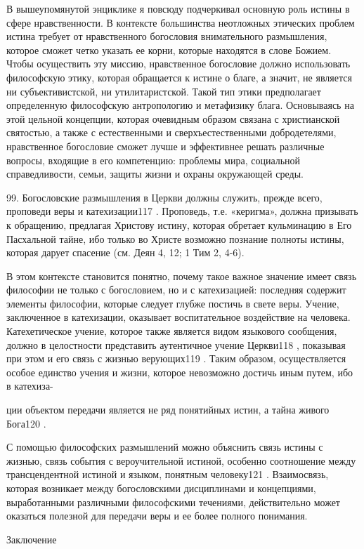 \documentclass[a5paper,10pt]{article}
\begin{document}
В вышеупомянутой энциклике я повсюду подчеркивал основную роль истины в сфере
нравственности. В контексте большинства неотложных этических проблем истина
требует от нравственного богословия внимательного размышления, которое сможет
четко указать ее корни, которые находятся в слове Божием. Чтобы осуществить эту
миссию, нравственное богословие должно использовать философскую этику, которая
обращается к истине о благе, а значит, не является ни субъективистской, ни
утилитаристской. Такой тип этики предполагает определенную философскую
антропологию и метафизику блага. Основываясь на этой цельной концепции, которая
очевидным образом связана с христианской святостью, а также с естественными и
сверхъестественными добродетелями, нравственное богословие сможет лучше и
эффективнее решать различные вопросы, входящие в его компетенцию: проблемы
мира, социальной справедливости, семьи, защиты жизни и охраны окружающей среды.

99. Богословские размышления в Церкви должны служить, прежде всего, проповеди
веры и катехизации117 . Проповедь, т.е. «керигма», должна призывать к
обращению, предлагая Христову истину, которая обретает кульминацию в Его
Пасхальной тайне, ибо только во Христе возможно познание полноты истины,
которая дарует спасение (см. Деян 4, 12; 1 Тим 2, 4-6).

В этом контексте становится понятно, почему такое важное значение имеет связь
философии не только с богословием, но и с катехизацией: последняя содержит
элементы философии, которые следует глубже постичь в свете веры. Учение,
заключенное в катехизации, оказывает воспитательное воздействие на человека.
Катехетическое учение, которое также является видом языкового сообщения, должно
в целостности представить аутентичное учение Церкви118 , показывая при этом и
его связь с жизнью верующих119 . Таким образом, осуществляется особое единство
учения и жизни, которое невозможно достичь иным путем, ибо в катехиза-

ции объектом передачи является не ряд понятийных истин, а тайна живого Бога120
.

С помощью философских размышлений можно объяснить связь истины с жизнью, связь
события с вероучительной истиной, особенно соотношение между трансцендентной
истиной и языком, понятным человеку121 . Взаимосвязь, которая возникает между
богословскими дисциплинами и концепциями, выработанными различными философскими
течениями, действительно может оказаться полезной для передачи веры и ее более
полного понимания.

Заключение
\end{document}
